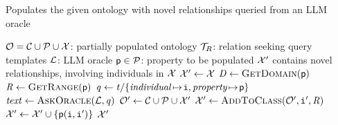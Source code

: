 \begin{algorithm}
    \captionsetup{font=\algCaptionSize}
    \caption{Populates the given ontology with novel relationships queried from an LLM oracle}
    \label{alg:relate}
    \begin{algorithmic}[1]\algCodeSize
        \Require $\relset{O} = \relset{C} \cup \relset{P} \cup \relset{X}$: partially populated ontology
        \Require $\relset{T}_{R}$: relation seeking query templates
        \Require $\relset{L}$: LLM oracle
        \Require $\relation{P} \in \relset{P}$: property to be populated
        \Ensure $\relset{X}'$ contains novel relationships, involving individuals in $\relset{X}$
        \medskip
            \State $\relset{X}' \gets \relset{X}$
            \State $\concept{D} \gets \Call{\getDomain}{\relation{P}}$
            \State $\concept{R} \gets \Call{\getRange}{\relation{P}}$
                    \State $\mathit{q} \gets \mathit{t}/\{ \var{individual} \!\mapsto\! \instance{i}, \var{property} \!\mapsto\! \relation{P} \}$
                    \State $\mathit{text} \gets \Call{\askOracle}{\relset{L}, \mathit{q}}$
                        \State $\relset{O}' \gets \relset{C} \cup \relset{P} \cup \relset{X}'$
                        \State $\relset{X}' \gets \Call{\addToClass}{\relset{O}', \instance{i}', \concept{R}}$
                        \State $\relset{X}' \gets \relset{X}' \cup \{ \relation{P}(\instance{i}, \instance{i}') \}$
                    \EndFor
                \EndFor
            \EndFor
            \State \Return $\relset{X}'$
        \EndFunction
    \end{algorithmic}
\end{algorithm}